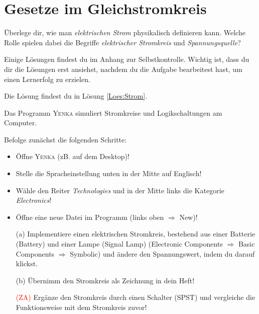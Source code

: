 \section{Gesetze im Gleichstromkreis}

\begin{Aufgabe} \label{Aufg:Strom}
Überlege dir, wie man \emph{elektrischen Strom} physikalisch definieren kann.
Welche Rolle spielen dabei die Begriffe \emph{elektrischer Stromkreis} und \emph{Spannungsquelle}?
\end{Aufgabe}


\begin{Loesung}
Einige Lösungen findest du im Anhang zur Selbstkontrolle.
Wichtig ist, dass du dir die Lösungen erst ansiehst, nachdem du die Aufgabe bearbeitest hast, um einen Lernerfolg zu erzielen.

Die Lösung findest du in Lösung \ref{Loes:Strom}.
\end{Loesung}


Das Programm \textsc{Yenka} simuliert Stromkreise und Logikschaltungen am Computer.

\begin{Aufgabe}
Befolge zunächst die folgenden Schritte:

\begin{itemize}
\item Öffne \textsc{Yenka} (zB. auf dem Desktop)!
\item Stelle die Spracheinstellung unten in der Mitte auf Englisch!
\item Wähle den Reiter \emph{Technologies} und in der Mitte links die Kategorie \emph{Electronics}!
\item Öffne eine neue Datei im Programm (links oben $\Rightarrow$ New)!
\item[(a)] Implementiere einen elektrischen Stromkreis, bestehend aus einer Batterie (Battery) und einer Lampe (Signal Lamp) (Electronic Components $\Rightarrow$ Basic Components $\Rightarrow$ Symbolic) und ändere den Spannungswert, indem du darauf klickst.
\item[(b)] Übernimm den Stromkreis als Zeichnung in dein Heft!
\item[\textcolor{red}{(ZA)}] Ergänze den Stromkreis durch einen Schalter (SPST) und vergleiche die Funktionsweise mit dem Stromkreis zuvor!
\end{itemize}
\end{Aufgabe}


